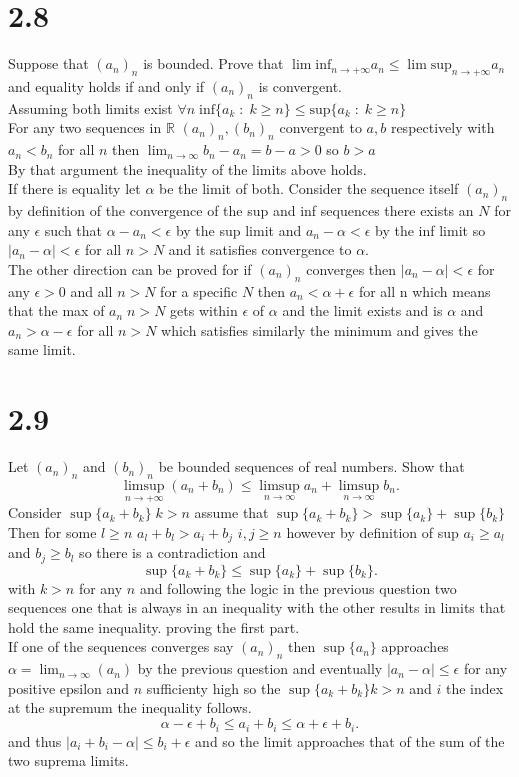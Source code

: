 \documentclass{article}
\begin{document}
    \section {2.8}
    Suppose that $(a_n)_n$ is bounded. Prove that $\lim \text{inf}_{n\to+\infty}a_n \le \lim \text{sup}_{n\to+\infty} a_n$ and equality holds if and only if $(a_n)_n$ is convergent.  
    \\
    Assuming both limits exist $\forall n \; \text{inf}\{a_k \; : \; k \ge n\} \le \text{sup}\{a_k \; : \; k \ge n\} $\\
    For any two sequences in $ \mathbb{R} $  $(a_n)_n, (b_n)_n$ convergent to $a,b$ respectively with $a_n < b_n$ for all $n$ then $\lim_{n\to\infty} b_n - a_n = b-a > 0$ so $b>a$\\
    By that argument the inequality of the limits above holds.\\

    If there is equality let  $\alpha$ be the limit of both.
    Consider the sequence itself  $(a_n)_n$ by definition of the convergence of the sup and inf sequences there exists an $N$ for any $\epsilon $ such that
    $\alpha - a_n < \epsilon  $ by the sup limit and $a_n - \alpha < \epsilon $ by the inf limit so $|a_n-\alpha| < \epsilon $ for all $n > N$ and it satisfies convergence to $\alpha $.
    \\
    The other direction can be proved for if $(a_n)_n$ converges then  $|a_n-\alpha | < \epsilon $ for any $\epsilon > 0$ and all $n > N$ for a specific $N$ then $a_n < \alpha + \epsilon $ for all n which means that the max of $a_n \; n > N$ gets within  $\epsilon $ of $\alpha $ and the limit exists and is $\alpha $
    and $a_n > \alpha - \epsilon $ for all $n > N$ which satisfies similarly the minimum and gives the same limit.
    \section {2.9}
    Let $(a_n)_n$ and $(b_n)_n$ be bounded sequences of real numbers. Show that
    \[
        \limsup\limits_{n\to+\infty}(a_n+b_n) \le \limsup\limits_{n\to\infty}a_n + \limsup\limits_{n\to\infty}b_n
    .\] 
    Consider $\sup\{a_k + b_k\} \; k > n $
    assume that $\sup\{a_k + b_k\} > \sup\{a_k\} + \sup\{b_k\}$ 
    Then for some $l \ge n$ $a_l +b_l > a_i + b_j$  $i, j \ge n$ however by definition of sup
     $a_i \ge a_l$ and $b_j \ge b_l$ so there is a contradiction and
     \[
     \sup\{a_k + b_k\} \le \sup\{a_k\} + \sup\{b_k\}
     .\] 
     with $k > n$ for any $n$ and following the logic in the previous question two sequences one that is always in an inequality with the other results in limits that hold the same inequality.
     proving the first part.
    \\
    If one of the sequences converges say $(a_n)_n$ then $\sup\{a_n\}$ approaches  $\alpha  = \lim_{n\to\infty}(a_n)$ by the previous question and eventually
    $|a_n- \alpha| \le \epsilon $ for any positive epsilon and $n$ sufficienty high so the $\sup\{a_k + b_k\} k > n$ and  $i$ the index at the supremum the inequality follows.
    \[
    \alpha - \epsilon + b_i\le a_i + b_i \le \alpha + \epsilon + b_i
    .\] 
    and thus $|a_i+b_i-\alpha | \le b_i + \epsilon  $ and so the limit approaches that of the sum of the two suprema limits.
\end{document}

